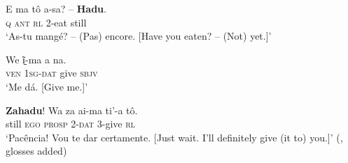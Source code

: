 \begin{exe}
	\ex\label{exAppendixXavanteNotYet1}
	\gll E ma tô a-sa? – \textbf{Hadu}.\\
	\textsc{q} \textsc{ant} \textsc{rl} 2-eat {} still\\
	\glt \lq As-tu mangé? -- (Pas) encore. [Have you eaten? -- (Not) yet.]\rq
	\parencite[107]{Estevam2011}

	\ex\label{exAppendixXavanteNotYet2}
	\begin{xlist}
		\gll We ĩ̠-ma a na.\\
		\textsc{ven} 1\textsc{sg}-\textsc{dat} give \textsc{sbjv}\\
		\glt \lq Me dá. [Give me.]\rq
		
		\gll \textbf{Zahadu}! Wa za ai-ma ti'-a tô.\\
		still \textsc{ego} \textsc{prosp} 2-\textsc{dat} 3-give \textsc{rl}\\
		\glt \lq Pacência! Vou te dar certamente. [Just wait. I'll definitely give (it to) you.]\rq{ }(\cite[123]{McLeod2004}, glosses added)
	\end{xlist}
\end{exe}
